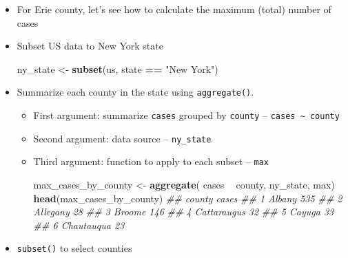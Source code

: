 \documentclass[]{book}
\newenvironment{Shaded}{\begin{snugshade}}{\end{snugshade}}
\newcommand{\CommentTok}[1]{\textcolor[rgb]{0.56,0.35,0.01}{\textit{#1}}}
\newcommand{\KeywordTok}[1]{\textcolor[rgb]{0.13,0.29,0.53}{\textbf{#1}}}
\newcommand{\NormalTok}[1]{#1}
\newcommand{\OperatorTok}[1]{\textcolor[rgb]{0.81,0.36,0.00}{\textbf{#1}}}
\newcommand{\StringTok}[1]{\textcolor[rgb]{0.31,0.60,0.02}{#1}}
\begin{document}
\begin{itemize}
\item
  For Erie county, let's see how to calculate the maximum (total) number of cases

\begin{Shaded}
\end{Shaded}
\item
  Subset US data to New York state

\begin{Shaded}
\begin{Highlighting}[]
\NormalTok{ny_state <-}\StringTok{ }\KeywordTok{subset}\NormalTok{(us, state }\OperatorTok{==}\StringTok{ "New York"}\NormalTok{)}
\end{Highlighting}
\end{Shaded}
\item
  Summarize each county in the state using \texttt{aggregate()}.

  \begin{itemize}
  \item
    First argument: summarize \texttt{cases} grouped by \texttt{county} -- \texttt{cases\ \textasciitilde{}\ county}
  \item
    Second argument: data source -- \texttt{ny\_state}
  \item
    Third argument: function to apply to each subset -- \texttt{max}

\begin{Shaded}
\begin{Highlighting}[]
\NormalTok{max_cases_by_county <-}\StringTok{ }\KeywordTok{aggregate}\NormalTok{( cases }\OperatorTok{~}\StringTok{ }\NormalTok{county, ny_state, max)}
\KeywordTok{head}\NormalTok{(max_cases_by_county)}
\CommentTok{##        county cases}
\CommentTok{## 1      Albany   535}
\CommentTok{## 2    Allegany    28}
\CommentTok{## 3      Broome   146}
\CommentTok{## 4 Cattaraugus    32}
\CommentTok{## 5      Cayuga    33}
\CommentTok{## 6  Chautauqua    23}
\end{Highlighting}
\end{Shaded}
  \end{itemize}
\item
  \texttt{subset()} to select counties


\end{itemize}
\end{document}
